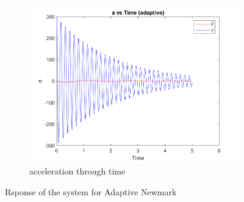 \documentclass[a4paper,12pt]{article}
\begin{document}
\begin{figure}[h]
  \vspace{0.5cm}

  \begin{subfigure}[b]{0.5\textwidth}
      \includegraphics[width=\textwidth]{../../Matlab/adaptive_plots/a_vs_time.png}
      \caption{acceleration through time}
      \label{fig:image15}
  \end{subfigure}
  \hfill
  
  \caption{Rsponse of the system for Adaptive Newmark}
  \label{fig:response_adapt_newmark}
\end{figure}

\end{document}
